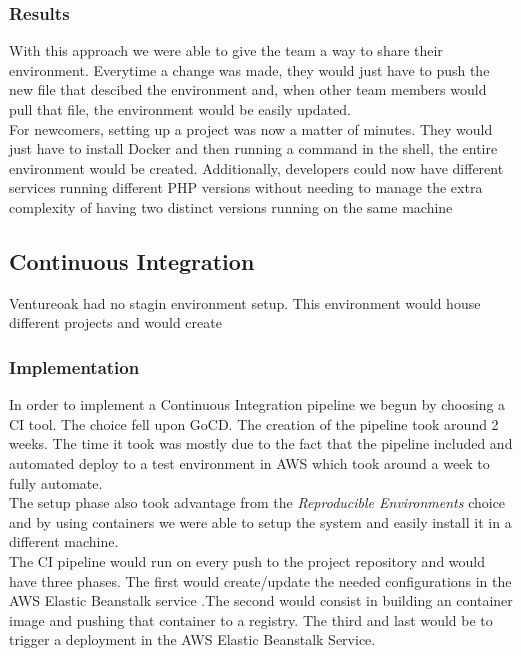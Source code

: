 				\subsubsection*{Results}
					With this approach we were able to give the team a way to share their environment. Everytime a change was made, they would just have to push the new file that descibed the environment and, when other team members would pull that file, the environment would be easily updated. \\
					For newcomers, setting up a project was now a matter of minutes. They would just have to install Docker and then running a command in the shell, the entire environment would be created.
					Additionally, developers could now have different services running different PHP versions without needing to manage the extra complexity of having two distinct versions running on the same machine
			\subsection{Continuous Integration}
					Ventureoak had no stagin environment setup. This environment would house different projects and would create
					\subsubsection*{Implementation}
					In order to implement a Continuous Integration pipeline we begun by choosing a CI tool. The choice fell upon GoCD. The creation of the pipeline took around 2 weeks. The time it took was mostly due to the fact that the pipeline included and automated deploy to a test environment in AWS which took around a week to fully automate. \\
					The setup phase also took advantage from the \textit{Reproducible Environments} choice and by using containers we were able to setup the system and easily install it in a different machine. \\
					The CI pipeline would run on every push to the project repository and would have three phases. The first would create/update the needed configurations in the AWS Elastic Beanstalk service .The second would consist in building an container image and pushing that container to a registry. The third and last would be to trigger a deployment in the AWS Elastic Beanstalk Service. \\
